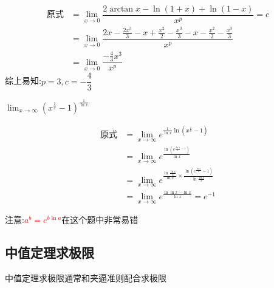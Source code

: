\documentclass[8pt a4paper, oneside, UTF8]{ctexbook}
\begin{document}
\begin{sloppypar}
\begin{problem}
    \end{problem}
    \begin{solution}
        \begin{align*}
            \text{原式} & =\lim_{x\to0} \dfrac{2\arctan x-\ln(1+x)+\ln(1-x)}{x^p}=c                                                   \\
                      & =   \lim_{x\to0} \dfrac{2x-\frac{2x^3}{3}-x+\frac{x^2}{2}-\frac{x^3}{3}-x-\frac{x^2}{2}-\frac{x^3}{3}}{x^p} \\
                      & = \lim_{x\to 0}\dfrac{-\frac{4}{3}x^3}{x^p}
        \end{align*}
        综上易知:$p=3,c=-\dfrac{4}{3}$
    \end{solution}
    \begin{problem}
    $\lim_{x\to \infty}\left(x^{\frac{1}{x}}-1\right)^{\frac{1}{\ln x}}$
    \end{problem}
    \begin{solution}
        \begin{align*}
            \text{原式} & =\lim_{x\to \infty} e^{\frac{1}{\ln x}\ln(x^\frac{1}{x}-1)}                                                           \\
                      & = \lim_{x\to \infty} e^{\frac{\ln(e^{\frac{\ln x}{x}-1})}{\ln x}}                                                     \\
                      & = \lim_{x\to \infty} e^{\frac{\ln{\frac{\ln x}{x}}}{\ln x}\times \frac{\ln(e^\frac{\ln x}{x}-1)}{\ln\frac{\ln x}{x}}} \\
                      & = \lim_{x\to \infty} e^{\frac{\ln \ln x-\ln x}{\ln x}} = e^{-1}
        \end{align*}
    \end{solution}
    \begin{note}
        注意:\textcolor{red}{$a^b=e^{b\ln a}$}在这个题中非常易错
    \end{note}
    \subsection{中值定理求极限}
    中值定理求极限通常和夹逼准则配合求极限

\end{sloppypar}
\end{document}
